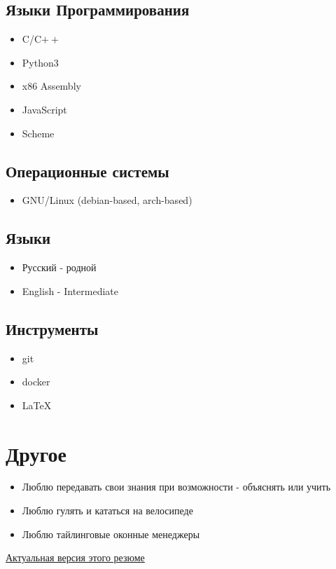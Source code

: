\documentclass{article}
\begin{document}
        \begin{multicols}{2}
            \subsection{Языки Программирования}
                \begin{itemize}
                    \item C/C$\boldsymbol{++}$
                    \item Python3
                    \item x86 Assembly
                    \item JavaScript
                    \item Scheme
                \end{itemize}

            \subsection{Операционные системы}
               \begin{itemize}
                    \item GNU/Linux (debian-based, arch-based)
               \end{itemize}
            \subsection{Языки}
                \begin{itemize}
                    \item Русский - родной
                    \item English - Intermediate
                \end{itemize}
            \subsection{Инструменты}
                \begin{itemize}
                    \item git
                    \item docker
                    \item \LaTeX
                \end{itemize}
        \end{multicols}

    \section{Другое}
        \begin{itemize}
            \item Люблю передавать свои знания при возможности - объяснять или учить
            \item Люблю гулять и кататься на велосипеде
            \item Люблю тайлинговые оконные менеджеры
        \end{itemize}
        
    \vspace{\fill}
    \begin{center}
        \large
        \href {https://github.com/InversionSpaces/resume}{Актуальная версия этого резюме}
    \end{center}
\end{document}
